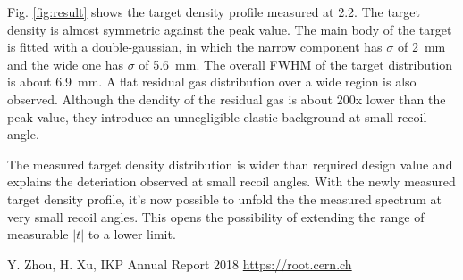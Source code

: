 \documentclass[fleqn,twocolumn,a4paper]{ikpar}
\begin{document}
\par
\medskip

Fig. \ref{fig:result} shows the target density profile measured at
\SI{2.2}{\momentum}.
The target density is almost symmetric against the peak value.
The main body of the target is fitted with a double-gaussian, in which the
narrow component has $\sigma$ of \SI{2}{mm} and the wide one has $\sigma$ of \SI{5.6}{mm}.
The overall FWHM of the target distribution is about \SI{6.9}{mm}.
A flat residual gas distribution over a wide region is also observed.
Although the dendity of the residual gas is about 200x lower than the peak
value, they introduce an unnegligible elastic background at small recoil angle.

The measured target density distribution is wider than required design value and
explains the deteriation observed at small recoil angles.
With the newly measured target density profile, it's now possible to unfold the the
measured spectrum at very small recoil angles.
This opens the possibility of extending the range of measurable $|t|$ to a lower limit.

\par
\medskip

\begin{thebibliography}{99}
 Y. Zhou, H. Xu, IKP Annual Report 2018
 \url{https://root.cern.ch}
\end{thebibliography}
\end{document}
